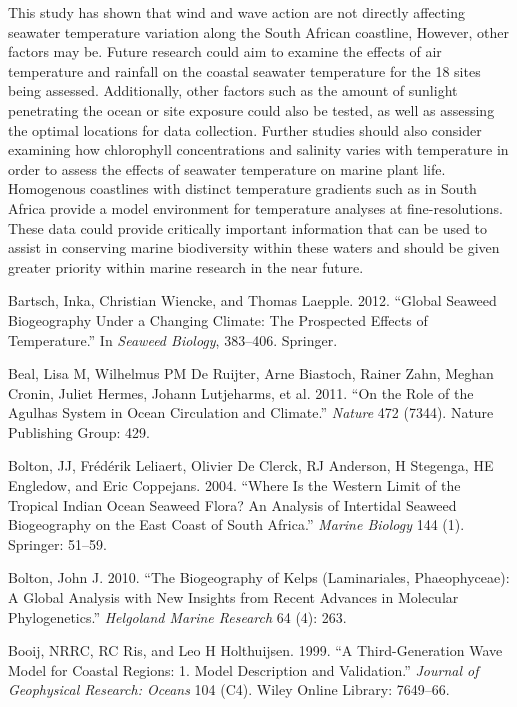 \documentclass[12pt,A4paper,]{article}
\begin{document}
This study has shown that wind and wave action are not directly
affecting seawater temperature variation along the South African
coastline, However, other factors may be. Future research could aim to
examine the effects of air temperature and rainfall on the coastal
seawater temperature for the 18 sites being assessed. Additionally,
other factors such as the amount of sunlight penetrating the ocean or
site exposure could also be tested, as well as assessing the optimal
locations for data collection. Further studies should also consider
examining how chlorophyll concentrations and salinity varies with
temperature in order to assess the effects of seawater temperature on
marine plant life. Homogenous coastlines with distinct temperature
gradients such as in South Africa provide a model environment for
temperature analyses at fine-resolutions. These data could provide
critically important information that can be used to assist in
conserving marine biodiversity within these waters and should be given
greater priority within marine research in the near future.

\hypertarget{refs}{}
\hypertarget{ref-Bartsch2012}{}
Bartsch, Inka, Christian Wiencke, and Thomas Laepple. 2012. ``Global
Seaweed Biogeography Under a Changing Climate: The Prospected Effects of
Temperature.'' In \emph{Seaweed Biology}, 383--406. Springer.

\hypertarget{ref-Beal2011}{}
Beal, Lisa M, Wilhelmus PM De Ruijter, Arne Biastoch, Rainer Zahn,
Meghan Cronin, Juliet Hermes, Johann Lutjeharms, et al. 2011. ``On the
Role of the Agulhas System in Ocean Circulation and Climate.''
\emph{Nature} 472 (7344). Nature Publishing Group: 429.

\hypertarget{ref-Bolton2004}{}
Bolton, JJ, Frédérik Leliaert, Olivier De Clerck, RJ Anderson, H
Stegenga, HE Engledow, and Eric Coppejans. 2004. ``Where Is the Western
Limit of the Tropical Indian Ocean Seaweed Flora? An Analysis of
Intertidal Seaweed Biogeography on the East Coast of South Africa.''
\emph{Marine Biology} 144 (1). Springer: 51--59.

\hypertarget{ref-Bolton2010}{}
Bolton, John J. 2010. ``The Biogeography of Kelps (Laminariales,
Phaeophyceae): A Global Analysis with New Insights from Recent Advances
in Molecular Phylogenetics.'' \emph{Helgoland Marine Research} 64 (4):
263.

\hypertarget{ref-Booij1999}{}
Booij, NRRC, RC Ris, and Leo H Holthuijsen. 1999. ``A Third-Generation
Wave Model for Coastal Regions: 1. Model Description and Validation.''
\emph{Journal of Geophysical Research: Oceans} 104 (C4). Wiley Online
Library: 7649--66.
\end{document}

